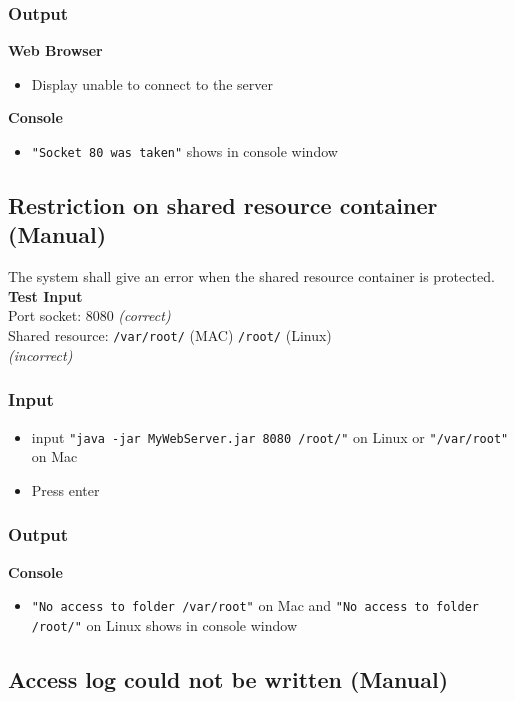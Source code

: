 \documentclass[a4paper, 12pt]{article}
\begin{document}
\subsubsection{Output}
\textbf{Web Browser}
\begin{itemize}
\item Display unable to connect to the server
\end{itemize}

\textbf{Console}
\begin{itemize}
\item \texttt{"Socket 80 was taken"} shows in console window
\end{itemize}

\subsection{Restriction on shared resource container (Manual)}

The system shall give an error when the shared resource container is protected.\\
\textbf{Test Input} \\ Port socket: 8080 \textit{(correct)} \\ Shared resource: \texttt{/var/root/} (MAC) \texttt{/root/} (Linux) \\ \textit{(incorrect)}
 
\subsubsection{Input}
\begin{itemize}
\item input \texttt{"java -jar MyWebServer.jar 8080 /root/"} on Linux or \texttt{"/var/root"} on Mac
\item Press enter
\end{itemize} 

\subsubsection{Output}
\textbf{Console}
\begin{itemize}
\item \texttt{"No access to folder /var/root"} on Mac and \texttt{"No access to folder /root/"} on Linux shows in console window
\end{itemize}

\subsection{Access log could not be written (Manual)}
\end{document}
